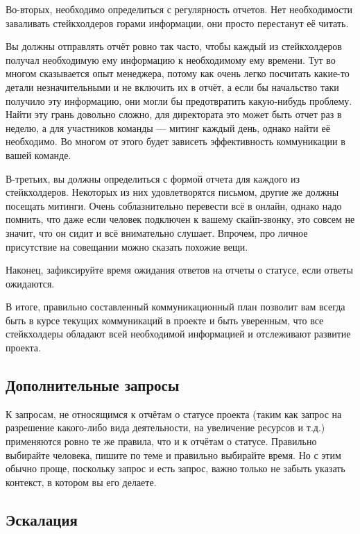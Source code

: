 \documentclass{../../text-style}
\begin{document}
Во-вторых, необходимо определиться с регулярность отчетов. Нет необходимости заваливать стейкхолдеров горами информации, они просто перестанут её читать.

Вы должны отправлять отчёт ровно так часто, чтобы каждый из стейкхолдеров получал необходимую ему информацию к необходимому ему времени. Тут во многом сказывается опыт менеджера, потому как очень легко посчитать какие-то детали незначительными и не включить их в отчёт, а если бы начальство таки получило эту информацию, они могли бы предотвратить какую-нибудь проблему. Найти эту грань довольно сложно, для директората это может быть отчет раз в неделю, а для участников команды --- митинг каждый день, однако найти её необходимо. Во многом от этого будет зависеть эффективность коммуникации в вашей команде.

В-третьих, вы должны определиться с формой отчета для каждого из стейкхолдеров. Некоторых из них удовлетворятся письмом, другие же должны посещать митинги. Очень соблазнительно перевести всё в онлайн, однако надо помнить, что даже если человек подключен к вашему скайп-звонку, это совсем не значит, что он сидит и всё внимательно слушает. Впрочем, про личное присутствие на совещании можно сказать похожие вещи.

Наконец, зафиксируйте время ожидания ответов на отчеты о статусе, если ответы ожидаются.

В итоге, правильно составленный коммуникационный план позволит вам всегда быть в курсе текущих коммуникаций в проекте и быть уверенным, что все стейкхолдеры обладают всей необходимой информацией и отслеживают развитие проекта.

\subsection{Дополнительные запросы}

К запросам, не относящимся к отчётам о статусе проекта (таким как запрос на разрешение какого-либо вида деятельности, на увеличение ресурсов и т.д.) применяются ровно те же правила, что и к отчётам о статусе. Правильно выбирайте человека, пишите по теме и правильно выбирайте время. Но с этим обычно проще, поскольку запрос и есть запрос, важно только не забыть указать контекст, в котором вы его делаете. 

\subsection{Эскалация}
\end{document}
